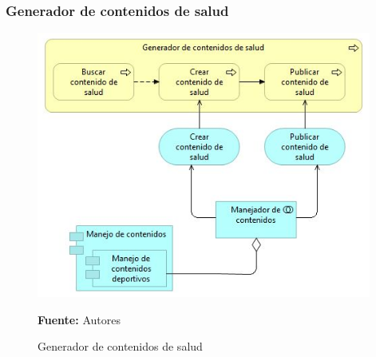 \subsubsection{Generador de contenidos de salud}

\begin{figure}[!htb]
  \begin{center}
    \includegraphics[width=11cm]{./imagenes/application_usage/generadorcontenidossalud.png}
    \caption{Generador de contenidos de salud}
    \label{fig:BP_GeneradorContenidosSalud}
    \textbf{Fuente:}  Autores
  \end{center}
\end{figure}

